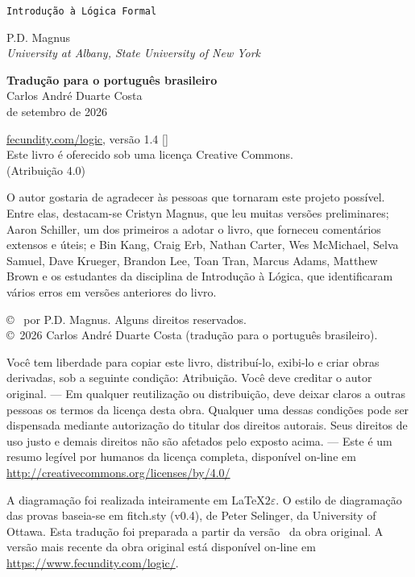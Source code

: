 \thispagestyle{empty}
{\Huge\forallx}

{\tt Introdução à Lógica Formal}

\vfill

{\sf P.D. Magnus}\\
\emph{University at Albany, State University of New York}

\vfill

{\sf \textbf{Tradução para o português brasileiro}}\\
{\sf Carlos André Duarte Costa}\\
{ de setembro de 2026}

\vfill

{\sf
  \href{https://www.fecundity.com/logic/}{fecundity.com/logic}, versão 1.4 [\bookversion]\\
  Este livro é oferecido sob uma licença Creative Commons.\\
  (Atribuição 4.0)
}

\newpage
\thispagestyle{empty}%

{\sf
O autor gostaria de agradecer às pessoas que tornaram este projeto possível. Entre elas, destacam-se Cristyn Magnus, que leu muitas versões preliminares; Aaron Schiller, um dos primeiros a adotar o livro, que forneceu comentários extensos e úteis; e Bin Kang, Craig Erb, Nathan Carter, Wes McMichael, Selva Samuel, Dave Krueger, Brandon Lee, Toan Tran, Marcus Adams, Matthew Brown e os estudantes da disciplina de Introdução à Lógica, que identificaram vários erros em versões anteriores do livro.
}

\vfill
{
\copyright\  por P.D. Magnus. Alguns direitos reservados.\\
\copyright\ 2026 Carlos André Duarte Costa (tradução para o português brasileiro).
}

{\footnotesize
Você tem liberdade para copiar este livro, distribuí-lo, exibi-lo e criar obras derivadas, sob a seguinte condição: Atribuição. Você deve creditar o autor original. --- Em qualquer reutilização ou distribuição, deve deixar claros a outras pessoas os termos da licença desta obra. Qualquer uma dessas condições pode ser dispensada mediante autorização do titular dos direitos autorais. Seus direitos de uso justo e demais direitos não são afetados pelo exposto acima. --- Este é um resumo legível por humanos da licença completa, disponível on-line em \url{http://creativecommons.org/licenses/by/4.0/}
}

{
A diagramação foi realizada inteiramente em \LaTeX$2\varepsilon$. O estilo de diagramação das provas baseia-se em fitch.sty (v0.4), de Peter Selinger, da University of Ottawa. Esta tradução foi preparada a partir da versão \editionoriginalversion\ da obra original. A versão mais recente da obra original está disponível on-line em \url{https://www.fecundity.com/logic/}.
}

